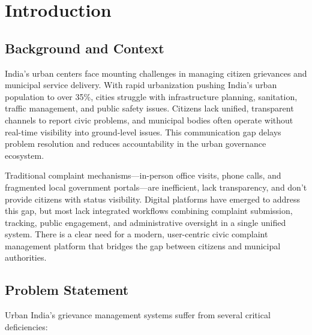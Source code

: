 \documentclass[12pt,a4paper]{report}
\begin{document}

\chapter{Introduction}

\section{Background and Context}
India's urban centers face mounting challenges in managing citizen grievances and municipal service delivery. With rapid urbanization pushing India's urban population to over 35\%, cities struggle with infrastructure planning, sanitation, traffic management, and public safety issues. Citizens lack unified, transparent channels to report civic problems, and municipal bodies often operate without real-time visibility into ground-level issues. This communication gap delays problem resolution and reduces accountability in the urban governance ecosystem.

Traditional complaint mechanisms—in-person office visits, phone calls, and fragmented local government portals—are inefficient, lack transparency, and don't provide citizens with status visibility. Digital platforms have emerged to address this gap, but most lack integrated workflows combining complaint submission, tracking, public engagement, and administrative oversight in a single unified system. There is a clear need for a modern, user-centric civic complaint management platform that bridges the gap between citizens and municipal authorities.

\section{Problem Statement}
Urban India's grievance management systems suffer from several critical deficiencies:
\end{document}
